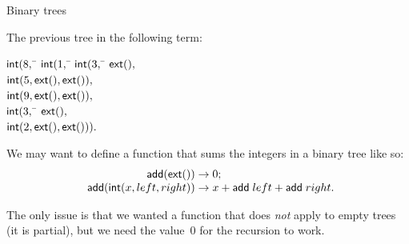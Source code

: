 %
\begin{frame}{Binary trees}

  The previous tree in the following term:
  \begin{tabbing}
    $\textsf{int}(8,$ \= $\textsf{int}(1,$ \= $\textsf{int}(3,$ \= $\textsf{ext}(),$\\
                   \>                \>                \> $\textsf{int}(5, \textsf{ext}(), \textsf{ext}()),$\\
                   \>                \> $\textsf{int}(9, \textsf{ext}(), \textsf{ext}()),$\\
                   \> $\textsf{int}(3,$ \= $\textsf{ext}(),$\\
                   \>                \> $\textsf{int}(2, \textsf{ext}(), \textsf{ext}())).$
  \end{tabbing}
  We may want to define a function that sums the integers in a binary
  tree like so:
  \begin{equation*}
    \begin{array}{r@{\;}l@{\;}l@{}}
      \fun{add}(\fun{ext}()) & \rightarrow & 0;\\
      \fun{add}(\fun{int}(x, left, right)) & \rightarrow & x + \fun{add} \; left + \fun{add} \; right.
    \end{array}
  \end{equation*}

  The only issue is that we wanted a function that does \emph{not}
  apply to empty trees (it is partial), but we need the value~\(0\)
  for the recursion to work.

\end{frame}

